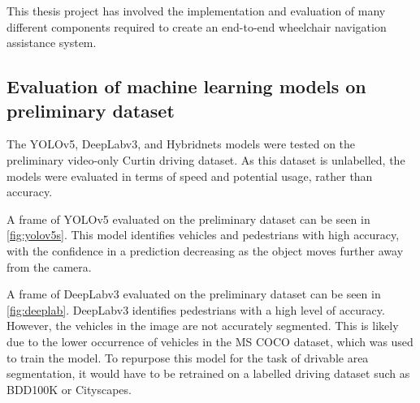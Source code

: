 This thesis project has involved the implementation and evaluation
of many different components required to create an end-to-end wheelchair
navigation assistance system.

\subsection{Evaluation of machine learning models on preliminary dataset}
The YOLOv5, DeepLabv3, and Hybridnets models were tested on the preliminary
video-only Curtin driving dataset. As this dataset is unlabelled, the
models were evaluated in terms of speed and potential usage, rather than accuracy.

A frame of YOLOv5 evaluated on the preliminary dataset can be seen in \cref{fig:yolov5s}.
This model identifies vehicles and pedestrians with high accuracy, with the confidence in
a prediction decreasing as the object moves further away from the camera.

A frame of DeepLabv3 evaluated on the preliminary dataset can be seen in \cref{fig:deeplab}.
DeepLabv3 identifies pedestrians with a high level of accuracy. However, the vehicles in the
image are not accurately segmented. This is likely due to the lower occurrence of vehicles
in the MS COCO dataset, which was used to train the model.
To repurpose this model for the task of drivable area segmentation,
it would have to be retrained on a labelled driving dataset such as BDD100K or Cityscapes.

